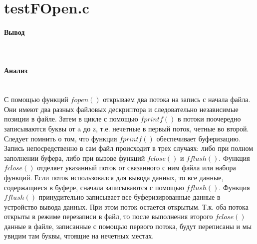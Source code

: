\section{testFOpen.c}


\paragraph{Вывод}\hfill\\



\paragraph{Анализ}\hfill\\

С помощью функций $fopen()$ открываем два потока на запись с начала файла. Они имеют два разных файловых дескриптора и следовательно независимые позиции в файле. Затем в цикле с помощью $fprintf()$ в потоки поочередно записываются буквы от a до z, т.е. нечетные в первый поток, четные во второй. Следует помнить о том, что функция $fprintf()$ обеспечивает буферизацию. Запись непосредственно в сам файл происходит в трех случаях: либо при полном заполнении буфера, либо при вызове функций $fclose()$ и $fflush()$. Функция $fclose()$ отделяет указанный поток от связанного с ним файла или набора функций. Если поток использовался для вывода данных, то все данные, содержащиеся в буфере, сначала записываются с помощью $fflush()$. Функция $fflush()$ принудительно записывает все буферизированные данные в устройство вывода данных. При этом поток остается открытым. Т.к. оба потока открыты в режиме перезаписи в файл, то после выполнения второго $fclose()$ данные в файле, записанные с помощью первого потока, будут переписаны и мы увидим там буквы, чтоящие на нечетных местах.



